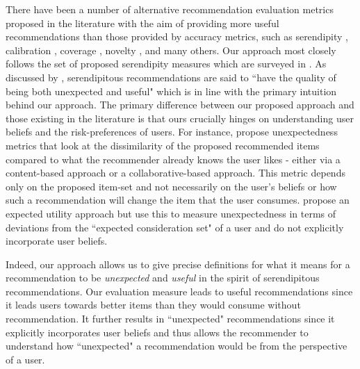 \documentclass[manuscript]{acmart}
\begin{document}
\par 
There have been a number of alternative recommendation evaluation metrics proposed in the literature with the aim of providing more useful recommendations than those provided by accuracy metrics, such as serendipity \cite{kotkov2016survey}, calibration \cite{steck2018calibrated}, coverage \cite{ge2010beyond}, novelty \cite{vargas2011rank}, and many others. Our approach most closely follows the set of proposed serendipity measures which are surveyed in \cite{kotkov2016survey}. As discussed by \cite{maksai2015predicting},  serendipitous recommendations are said to ``have the quality of being both unexpected and useful" which is in line with the primary intuition behind our approach. The primary difference between our proposed approach and those existing in the literature is that ours crucially hinges on understanding user beliefs and the risk-preferences of users. For instance, \cite{vargas2011rank, kaminskas2014measuring} propose unexpectedness metrics that look at the dissimilarity of the proposed recommended items compared to what the recommender already knows the user likes - either via a content-based approach or a collaborative-based approach. This metric depends only on the proposed item-set and not necessarily on the user's beliefs or how such a recommendation will change the item that the user consumes. \cite{adamopoulos2015unexpectedness} propose an expected utility approach but use this to measure unexpectedness in terms of deviations from the ``expected consideration set" of a user and do not explicitly incorporate user beliefs.
\par 
Indeed, our approach allows us to give precise definitions for what it means for a recommendation to be \textit{unexpected} and \textit{useful} in the spirit of serendipitous recommendations. Our evaluation measure leads to useful recommendations since it leads users towards better items than they would consume without recommendation. It further results in ``unexpected" recommendations since it explicitly incorporates user beliefs and thus allows the recommender to understand how ``unexpected" a recommendation would be from the perspective of a user.


\end{document}
